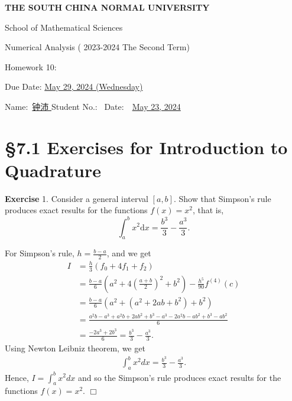 \documentclass[UTF8,12pt,hyperref]{ctexart}
\makeatletter
\newenvironment{exercise}[1][{\color{blue}\bf Exercise}]%
{%
 \begin{center}   \begin{lrbox}{\@tempboxa}%
    \begin{minipage}{\textwidth}%
  {\color{blue}\bfseries
#1}   }{%
    \end{minipage}%
    \end{lrbox}
    \colorbox{green}{\noindent\usebox{\@tempboxa}} \end{center}  
}
\newenvironment{solve}[1][\color{blue}\bf Solve]{\begin{trivlist}
\item[\hskip \labelsep {\color{blue}\bfseries
#1}]}{\hfill$\Box$\end{trivlist}}
\makeatother
\begin{document}

\begin{center}
{\bf  THE SOUTH CHINA NORMAL UNIVERSITY\vspace{0.08cm}

School of Mathematical Sciences\vspace{0.08cm}
 
Numerical Analysis ( 2023-2024 The Second Term) \vspace{0.18cm}

{\Large Homework 10: }\vspace{0.18cm}

Due Date: \underline{May 29, 2024 (Wednesday)} }
\end{center}\vspace{-0.16cm}

\begin{center}
  Name:\ \underline{\qquad 钟沛 \hspace{1cm}}\hspace{0.298cm}  
  Student No.:\ \underline{\hspace{1cm}} 
%
Date:\ \ \underline{May 23, 2024} 
 \end{center}
 
 

\section*{\S 7.1  Exercises for Introduction to Quadrature}

\begin{exercise}1.    \quad %
 Consider a general interval $[a, b]$. Show that Simpson's rule produces exact results for the functions $f(x) =x^2$, that is, 
$$
\displaystyle\int_a^bx^2 \mathrm{d} x=\dfrac{b^3}{3}-\dfrac{a^3}{3}.
$$  
\end{exercise}  
 

\begin{solve}
  For Simpson's rule, $h=\frac{b-a}{2}$, and we get
  \begin{align*}
    I &=\frac{h}{3}(f_0+4f_1+f_2)\\
    &= \frac{b-a}{6}(a^2+4(\frac{a+b}{2})^2+b^2)-\frac{h^5}{90}f^{(4)}(c)\\
    &= \frac{b-a}{6}(a^2+(a^2+2ab+b^2)+b^2)\\
    &= \frac{a^2b-a^3+a^2b+2ab^2+b^3-a^3-2a^2b-ab^2+b^3-ab^2}{6}\\
    &= \frac{-2a^3+2b^3}{6}=\frac{b^3}{3}-\frac{a^3}{3}.
  \end{align*}
  Using Newton Leibniz theorem, we get 
  \begin{align*}
    \int_{a}^{b} x^2dx = \frac{b^3}{3}-\frac{a^3}{3}.
  \end{align*}
  Hence, $I=\int_{a}^{b}x^2dx$ and so the Simpson's rule produces exact results for the functions $f(x) =x^2$.
\end{solve}
  
\end{document}
